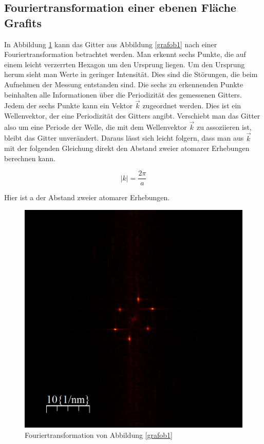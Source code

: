 \documentclass[10pt,a4paper]{article}
\begin{document}
\subsection{Fouriertransformation einer ebenen Fläche Grafits}

In Abbildung \ref{fouriertansformation_ebene} kann das Gitter aus Abbildung \ref{grafob1} nach einer Fouriertransformation betrachtet werden. Man erkennt sechs Punkte, die auf einem leicht verzerrten Hexagon um den Ursprung liegen. Um den Ursprung herum sieht man Werte in geringer Intensität. Dies sind die Störungen, die beim Aufnehmen der Messung entstanden sind. Die sechs zu erkennenden Punkte beinhalten alle Informationen über die Periodizität des gemessenen Gitters. Jedem der sechs Punkte kann ein Vektor $\vec{k}$ zugeordnet werden. Dies ist ein Wellenvektor, der eine Periodizität des Gitters angibt. Verschiebt man das Gitter also um eine Periode der Welle, die mit dem Wellenvektor $\vec{k}$ zu assoziieren ist, bleibt das Gitter unverändert. Daraus lässt sich leicht folgern, dass man aus $\vec{k}$ mit der folgenden Gleichung direkt den Abstand zweier atomarer Erhebungen berechnen kann.

\begin{equation}
	|k| = \frac{2\pi}{a}
	\label{formelk}
\end{equation}

Hier ist a der Abstand zweier atomarer Erhebungen.

\begin{figure}[h]
	\centering
	
	\includegraphics[scale = 0.5]{Fouriertrasformation_kristall.png}
	
	\caption{Fouriertransformation von Abbildung \ref{grafob1}}
	\label{fouriertansformation_ebene}
\end{figure}
\end{document}
